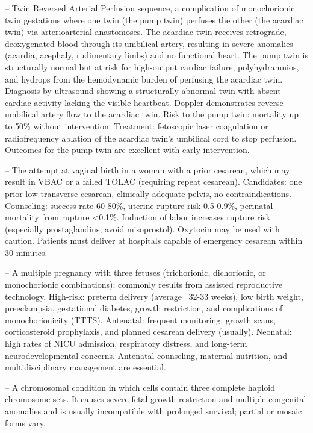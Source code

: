 -- Twin Reversed Arterial Perfusion sequence, a complication of monochorionic twin gestations where one twin (the pump twin) perfuses the other (the acardiac twin) via arterioarterial anastomoses. The acardiac twin receives retrograde, deoxygenated blood through its umbilical artery, resulting in severe anomalies (acardia, acephaly, rudimentary limbs) and no functional heart. The pump twin is structurally normal but at risk for high-output cardiac failure, polyhydramnios, and hydrops from the hemodynamic burden of perfusing the acardiac twin. Diagnosis by ultrasound showing a structurally abnormal twin with absent cardiac activity lacking the visible heartbeat. Doppler demonstrates reverse umbilical artery flow to the acardiac twin. Risk to the pump twin: mortality up to 50\% without intervention. Treatment: fetoscopic laser coagulation or radiofrequency ablation of the acardiac twin's umbilical cord to stop perfusion. Outcomes for the pump twin are excellent with early intervention.

-- The attempt at vaginal birth in a woman with a prior cesarean, which may result in VBAC or a failed TOLAC (requiring repeat cesarean). Candidates: one prior low-transverse cesarean, clinically adequate pelvis, no contraindications. Counseling: success rate 60-80\%, uterine rupture risk 0.5-0.9\%, perinatal mortality from rupture <0.1\%. Induction of labor increases rupture risk (especially prostaglandins, avoid misoprostol). Oxytocin may be used with caution. Patients must deliver at hospitals capable of emergency cesarean within 30 minutes.

-- A multiple pregnancy with three fetuses (trichorionic, dichorionic, or monochorionic combinations); commonly results from assisted reproductive technology. High-risk: preterm delivery (average ~32-33 weeks), low birth weight, preeclampsia, gestational diabetes, growth restriction, and complications of monochorionicity (TTTS). Antenatal: frequent monitoring, growth scans, corticosteroid prophylaxis, and planned cesarean delivery (usually). Neonatal: high rates of NICU admission, respiratory distress, and long-term neurodevelopmental concerns. Antenatal counseling, maternal nutrition, and multidisciplinary management are essential.

-- A chromosomal condition in which cells contain three complete haploid chromosome sets. It causes severe fetal growth restriction and multiple congenital anomalies and is usually incompatible with prolonged survival; partial or mosaic forms vary.

